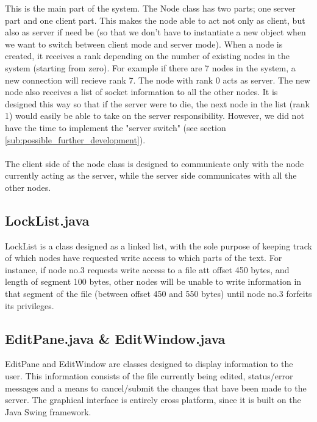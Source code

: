 \documentclass[12pt]{article}
\begin{document}
This is the main part of the system. The Node class has two parts; one server part and one client part. This makes the node able to act not only as client, but also as server if need be (so that we don't have to instantiate a new object when we want to switch between client mode and server mode). When a node is created, it receives a rank depending on the number of existing nodes in the system (starting from zero). For example if there are 7 nodes in the system, a new connection will recieve rank 7. The node with rank 0 acts as server. The new node also receives a list of socket information to all the other nodes. It is designed this way so that if the server were to die, the next node in the list (rank 1) would easily be able to take on the server responsibility. However, we did not have the time to implement the "server switch" (see section \ref{sub:possible_further_development}). 
\\\\
The client side of the node class is designed to communicate only with the node currently acting as the server, while the server side communicates with all the other nodes. 


\subsection{LockList.java} %
\label{sub:locklist_java}

LockList is a class designed as a linked list, with the sole purpose of keeping track of which nodes have requested write access to which parts of the text. For instance, if node no.3 requests write access to a file att offset 450 bytes, and length of segment 100 bytes, other nodes will be unable to write information in that segment of the file (between offset 450 and 550 bytes) until node no.3 forfeits its privileges.

\subsection{EditPane.java \& EditWindow.java} %
\label{sub:editpane}

EditPane and EditWindow are classes designed to display information to the user. This information consists of the file currently being edited, status/error messages and a means to cancel/submit the changes that have been made to the server. The graphical interface is entirely cross platform, since it is built on the Java Swing framework.
\end{document}
